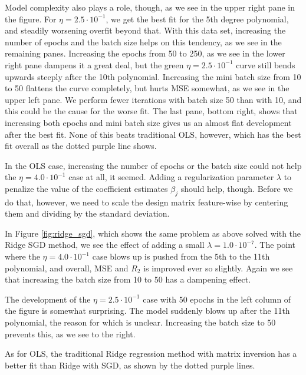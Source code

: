 \documentclass[]{article}
\begin{document}
Model complexity also plays a role, though, as we see in the upper right pane in the figure. For $\eta = 2.5 \cdot 10^{-1}$, we get the best fit for the 5th degree polynomial, and steadily worsening overfit beyond that. With this data set, increasing the number of epochs and the batch size helps on this tendency, as we see in the remaining panes. Increasing the epochs from 50 to 250, as we see in the lower right pane dampens it a great deal, but the green $\eta = 2.5 \cdot 10^{-1}$ curve still bends upwards steeply after the 10th polynomial. Increasing the mini batch size from 10 to 50 flattens the curve completely, but hurts MSE somewhat, as we see in the upper left pane. We perform fewer iterations with batch size 50 than with 10, and this could be the cause for the worse fit. The last pane, bottom right, shows that increasing both epochs and mini batch size gives us an almost flat development after the best fit. None of this beats traditional OLS, however, which has the best fit overall as the dotted purple line shows.

\vspace{5mm}

In the OLS case, increasing the number of epochs or the batch size could not help the $\eta = 4.0 \cdot 10^{-1}$ case at all, it seemed. Adding a regularization parameter $\lambda$ to penalize the value of the coefficient estimates $\beta_j$ should help, though. Before we do that, however, we need to scale the design matrix feature-wise by centering them and dividing by the standard deviation.

In Figure \ref{fig:ridge_sgd}, which shows the same problem as above solved with the Ridge SGD method, we see the effect of adding a small $\lambda = 1.0 \cdot 10 ^{-7}$. The point where the $\eta = 4.0 \cdot 10^{-1}$ case blows up is pushed from the 5th to the 11th polynomial, and overall, MSE and $R_2$ is improved ever so slightly. Again we see that increasing the batch size from 10 to 50 has a dampening effect.

The development of the $\eta = 2.5 \cdot 10^{-1}$ case with 50 epochs in the left column of the figure is somewhat surprising. The model suddenly blows up after the 11th polynomial, the reason for which is unclear. Increasing the batch size to 50 prevents this, as we see to the right.

As for OLS, the traditional Ridge regression method with matrix inversion has a better fit than Ridge with SGD, as shown by the dotted purple lines.

\vspace{5mm}
\end{document}
